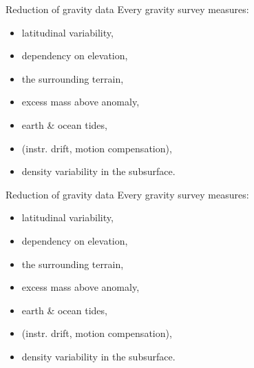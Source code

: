 \begin{frame}
  \begin{PointSix}{Reduction of gravity data}
    Every gravity survey measures:
    \begin{itemize}
      \item \textcolor{MyBlue}{latitudinal variability},
      \item \textcolor{MyBlue}{dependency on elevation},
      \item \textcolor{MyBlue}{the surrounding terrain},
      \item \textcolor{MyBlue}{excess mass above anomaly},
      \item \textcolor{MyBlue}{earth \& ocean tides},
      \item (instr. drift, motion compensation),
      \item \alert{density variability in the subsurface.}
    \end{itemize}
  \end{PointSix}
\end{frame}

\begin{frame}
  \begin{PointSix}{Reduction of gravity data}
    Every gravity survey measures:
    \begin{itemize}
      \item \textcolor{MyBlue}{latitudinal variability},
      \item \textcolor{MyBlue}{dependency on elevation},
      \item \textcolor{MyBlue}{the surrounding terrain},
      \item \textcolor{MyBlue}{excess mass above anomaly},
      \item \textcolor{MyBlue}{earth \& ocean tides},
      \item \textcolor{MyBlue}{(instr. drift, motion compensation)},
      \item \alert{density variability in the subsurface.}
    \end{itemize}
  \end{PointSix}
\end{frame}